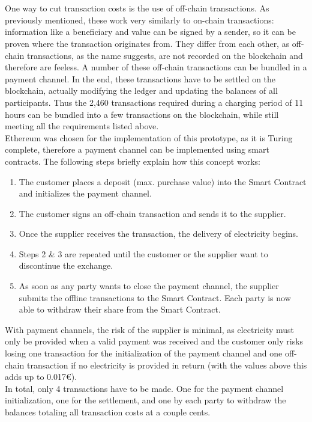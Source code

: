 \\\\
One way to cut transaction costs is the use of off-chain transactions. As previously mentioned, these work very similarly to on-chain transactions: information like a beneficiary and value can be signed by a sender, so it can be proven where the transaction originates from. They differ from each other, as off-chain transactions, as the name suggests, are not recorded on the blockchain and therefore are feeless. A number of these off-chain transactions can be bundled in a payment channel. In the end, these transactions have to be settled on the blockchain, actually modifying the ledger and updating the balances of all participants. Thus the 2,460 transactions required during a charging period of 11 hours can be bundled into a few transactions on the blockchain, while still meeting all the requirements listed above.
\\
Ethereum was chosen for the implementation of this prototype, as it is Turing complete, therefore a payment channel can be implemented using smart contracts. The following steps briefly explain how this concept works:

\begin{enumerate}
    \item The customer places a deposit (max. purchase value) into the Smart Contract and initializes the payment channel.
    \item The customer signs an off-chain transaction and sends it to the supplier.
    \item Once the supplier receives the transaction, the delivery of electricity begins.
    \item Steps 2 \& 3 are repeated until the customer or the supplier want to discontinue the exchange.
    \item As soon as any party wants to close the payment channel, the supplier submits the offline transactions to the Smart Contract. Each party is now able to withdraw their share from the Smart Contract.
\end{enumerate}
With payment channels, the risk of the supplier is minimal, as electricity must only be provided when a valid payment was received and the customer only risks losing one transaction for the initialization of the payment channel and one off-chain transaction if no electricity is provided in return (with the values above this adds up to 0.017\euro).
\\
In total, only 4 transactions have to be made. One for the payment channel initialization, one for the settlement, and one by each party to withdraw the balances totaling all transaction costs at a couple cents.